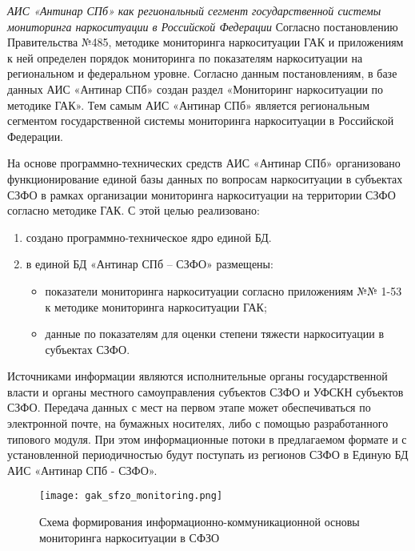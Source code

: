 \textit{АИС «Антинар СПб» как региональный сегмент государственной системы
мониторинга наркоситуации в Российской Федерации}
Согласно постановлению Правительства №485, методике мониторинга
наркоситуации ГАК и приложениям к ней определен порядок мониторинга по
показателям наркоситуации на региональном и федеральном уровне. Согласно данным
постановлениям, в базе данных АИС «Антинар СПб» создан раздел «Мониторинг
наркоситуации по методике ГАК». Тем самым АИС «Антинар СПб»
является региональным сегментом государственной системы мониторинга
наркоситуации в Российской Федерации.

На основе программно-технических средств АИС «Антинар СПб» организовано
функционирование единой базы данных по вопросам наркоситуации в субъектах СЗФО в
рамках организации мониторинга наркоситуации на территории СЗФО согласно
методике ГАК. С этой целью реализовано:
\begin{enumerate}
\item создано программно-техническое ядро единой БД.
\item в единой БД «Антинар СПб – СЗФО» размещены:
\begin{itemize}
\item показатели мониторинга наркоситуации согласно приложениям №№ 1-53 к методике
мониторинга наркоситуации ГАК; 
\item данные по показателям для оценки степени тяжести наркоситуации в субъектах
 СЗФО.
\end{itemize}
\end{enumerate}
 Источниками информации являются исполнительные органы государственной
 власти и органы местного самоуправления субъектов СЗФО и УФСКН субъектов СЗФО. 
 Передача данных с мест на первом этапе может обеспечиваться по электронной
 почте, на бумажных носителях, либо с помощью разработанного типового модуля.
 При этом информационные потоки в предлагаемом формате и с установленной
 периодичностью будут поступать из регионов СЗФО в Единую БД АИС «Антинар СПб -
 СЗФО».

\begin{figure}
    \centering
    \texttt{[image: gak\_sfzo\_monitoring.png]}
    \caption{Схема формирования информационно-коммуникационной основы
    мониторинга наркоситуации в СФЗО}
    \label{fig:gak_sfzo_monitoring}
\end{figure}

